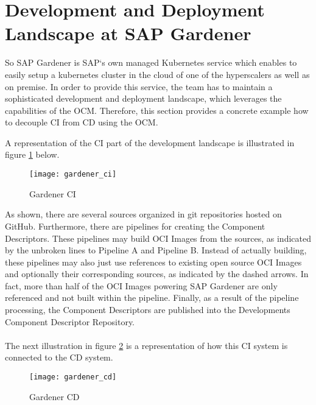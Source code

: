\section{Development and Deployment Landscape at SAP Gardener}
So SAP Gardener is SAP`s own managed Kubernetes service which enables to easily setup a kubernetes cluster in the cloud of one of the hyperscalers as well as on premise. In order to provide this service, the team has to maintain a sophisticated development and deployment landscape, which leverages the capabilities of the OCM. Therefore, this section provides a concrete example how to decouple CI from CD using the OCM.\par
A representation of the CI part of the development landscape is illustrated in figure \ref{fig:GardenerCI} below.

\begin{figure}[H]
	\centering
	\texttt{[image: gardener\_ci]}
	\caption[Gardener CI]{Gardener CI }
	\label{fig:GardenerCI}
\end{figure}

As shown, there are several sources organized in git repositories hosted on GitHub. Furthermore, there are pipelines for creating the Component Descriptors. These pipelines may build OCI Images from the sources, as indicated by the unbroken lines to Pipeline A and Pipeline B. Instead of actually building, these pipelines may also just use references to existing open source OCI Images and optionally their corresponding sources, as indicated by the dashed arrows. In fact, more than half of the OCI Images powering SAP Gardener are only referenced and not built within the pipeline. Finally, as a result of the pipeline processing, the Component Descriptors are published into the Developments Component Descriptor Repository.\\\\
The next illustration in figure \ref{fig:GardenerCD} is a representation of how this CI system is connected to the CD system.

\begin{figure}[H]
	\centering
	\texttt{[image: gardener\_cd]}
	\caption[Gardener CD]{Gardener CD }
	\label{fig:GardenerCD}
\end{figure}
 
